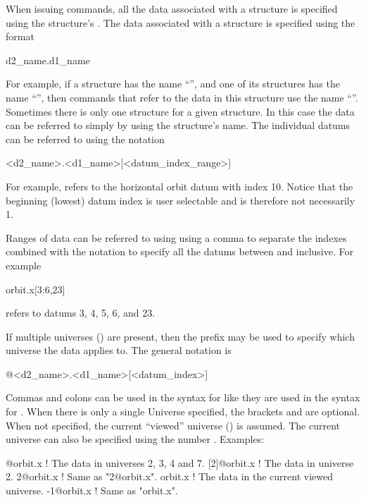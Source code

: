When issuing \tao commands, all the
data associated with a  structure is specified using the
 structure's .  The data associated with a
 structure is specified using the format
\begin{example}
  d2_name.d1_name
\end{example}
For example, if a  structure has the
name ``'', and one of its  structures has the
name ``'', then \tao commands that refer to the data in this
 structure use the name ``''. Sometimes there
is only one  structure for a given 
structure. In this case the data can be referred to simply by using
the  structure's name. The individual datums can be
referred to using the notation
\begin{example}
  <d2_name>.<d1_name>[<datum_index_range>]
\end{example}
For example,  refers to the horizontal orbit datum
with index 10. Notice that the beginning (lowest) datum index is user
selectable and is therefore not necessarily 1.

Ranges of data can be referred to using using a comma \vn{,} to
separate the indexes combined with the notation  to specify
all the datums between  and  inclusive. For example
\begin{example}
  orbit.x[3:6,23]
\end{example}
refers to datums 3, 4, 5, 6, and 23. 

If multiple universes () are present, then the prefix 
may be used to specify which universe the data applies to. The general notation is
\begin{example}
  @<d2_name>.<d1_name>[<datum_index>]
\end{example}
Commas and colons can be used in the syntax for 
like they are used in the syntax for . When
there is only a single Universe specified, the brackets \vn{[} and
\vn{]} are optional. When not specified, the current ``viewed''
universe () is assumed. The current  universe
can also be specified using the number . Examples:
\begin{example}
  [2:4,7]@orbit.x ! The  data in universes 2, 3, 4 and 7.
  [2]@orbit.x     ! The  data in universe 2. 
  2@orbit.x       ! Same as "2@orbit.x".
  orbit.x         ! The  data in the current viewed universe.
  -1@orbit.x      ! Same as "orbit.x".
\end{example}

